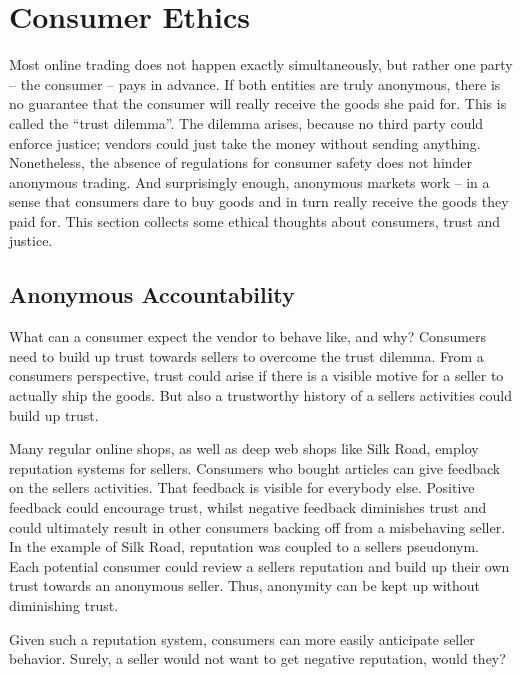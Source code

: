 \section{Consumer Ethics}
\label{consumers}

Most online trading does not happen exactly simultaneously, but rather one party -- the consumer -- pays in advance. If both entities are truly anonymous, there is no guarantee that the consumer will really receive the goods she paid for. This is called the ``trust dilemma''\cite{internetTrust2004}. The dilemma arises, because no third party could enforce justice; vendors could just take the money without sending anything. Nonetheless, the absence of regulations for consumer safety does not hinder anonymous trading. And surprisingly enough, anonymous markets work -- in a sense that consumers dare to buy goods and in turn really receive the goods they paid for\cite{silkroad2013}. This section collects some ethical thoughts about consumers, trust and justice. 

\subsection{Anonymous Accountability}

What can a consumer expect the vendor to behave like, and why? Consumers need to build up trust towards sellers to overcome the trust dilemma\cite{internetTrust2004}. From a consumers perspective, trust could arise if there is a visible motive for a seller to actually ship the goods. But also a trustworthy history of a sellers activities could build up trust.

Many regular online shops, as well as deep web shops like Silk Road, employ reputation systems for sellers\cite{internetTrust2004, silkroad2013}. Consumers who bought articles can give feedback on the sellers activities. That feedback is visible for everybody else. Positive feedback could encourage trust, whilst negative feedback diminishes trust and could ultimately result in other consumers backing off from a misbehaving seller\cite{internetTrust2004}. In the example of Silk Road, reputation was coupled to a sellers pseudonym\cite{silkroad2013}. Each potential consumer could review a sellers reputation and build up their own trust towards an anonymous seller. Thus, anonymity can be kept up without diminishing trust\cite{internetTrust2004}.

Given such a reputation system, consumers can more easily anticipate seller behavior. Surely, a seller would not want to get negative reputation, would they?

